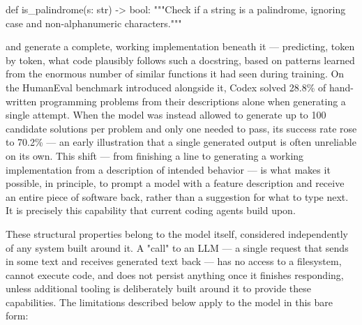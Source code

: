 \begin{pythoncode}
def is_palindrome(s: str) -> bool:
    """Check if a string is a palindrome, ignoring
    case and non-alphanumeric characters."""
\end{pythoncode}

and generate a complete, working implementation beneath it --- predicting, token by token, what code plausibly follows such a docstring, based on patterns learned from the enormous number of similar functions it had seen during training. On the HumanEval benchmark introduced alongside it, Codex solved 28.8\% of hand-written programming problems from their descriptions alone when generating a single attempt. When the model was instead allowed to generate up to 100 candidate solutions per problem and only one needed to pass, its success rate rose to 70.2\% \cite{chen2021evaluating} --- an early illustration that a single generated output is often unreliable on its own. This shift --- from finishing a line to generating a working implementation from a description of intended behavior --- is what makes it possible, in principle, to prompt a model with a feature description and receive an entire piece of software back, rather than a suggestion for what to type next. It is precisely this capability that current coding agents build upon.

These structural properties belong to the model itself, considered independently of any system built around it. A "call" to an LLM --- a single request that sends in some text and receives generated text back --- has no access to a filesystem, cannot execute code, and does not persist anything once it finishes responding, unless additional tooling is deliberately built around it to provide these capabilities. The limitations described below apply to the model in this bare form:

